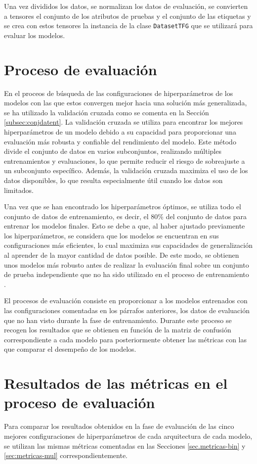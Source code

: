 Una vez divididos los datos, se normalizan los datos de evaluación, se convierten a tensores el conjunto de los atributos de pruebas y el conjunto de las etiquetas y se crea con estos tensores la instancia de la clase \texttt{DatasetTFG} que se utilizará para evaluar los modelos.

\section{Proceso de evaluación}
En el proceos de búsqueda de las configuraciones de hiperparámetros de los modelos con las que estos convergen mejor hacia una solución más generalizada, se ha utilizado la validación cruzada como se comenta en la Sección \ref{subsec:conjdatent}. La validación cruzada se utiliza para encontrar los mejores hiperparámetros de un modelo debido a su capacidad para proporcionar una evaluación más robusta y confiable del rendimiento del modelo. Este método divide el conjunto de datos en varios subconjuntos, realizando múltiples entrenamientos y evaluaciones, lo que permite reducir el riesgo de sobreajuste a un subconjunto específico. Además, la validación cruzada maximiza el uso de los datos disponibles, lo que resulta especialmente útil cuando los datos son limitados. 

Una vez que se han encontrado los hiperparámetros óptimos, se utiliza todo el conjunto de datos de entrenamiento, es decir, el 80\% del conjunto de datos para entrenar los modelos finales. Esto se debe a que, al haber ajustado previamente los hiperparámetros, se considera que los modelos se encuentran en sus configuraciones más eficientes, lo cual maximiza sus capacidades de generalización al aprender de la mayor cantidad de datos posible. De este modo, se obtienen unos modelos más robusto antes de realizar la evaluación final sobre un conjunto de prueba independiente que no ha sido utilizado en el proceso de entrenamiento \cite{hastie2009elements}.

El procesos de evaluación consiste en proporcionar a los modelos entrenados con las configuraciones comentadas en los párrafos anteriores, los datos de evaluación que no han visto durante la fase de entrenamiento. Durante este proceso se recogen los resultados que se obtienen en función de la matriz de confusión correspondiente a cada modelo para posteriormente obtener las métricas con las que comparar el desempeño de los modelos.

\section{Resultados de las métricas en el proceso de evaluación}
Para comparar los resultados obtenidos en la fase de evaluación de las cinco mejores configuraciones de hiperparámetros de cada arquitectura de cada modelo, se utilizan las mismas métricas comentadas en las Secciones \ref{sec.metricas-bin}  y \ref{sec:metricas-mul}  correspondientemente.

